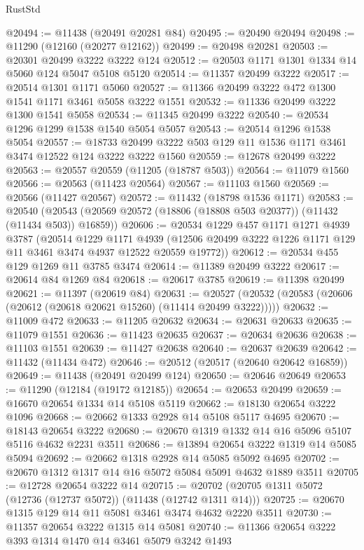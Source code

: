 \begin{lexlean}{RustStd}
\begin{coremodule}
@20494 := @11438 (@20491 @20281 @84)
@20495 := @20490 @20494
@20498 := @11290 (@12160 (@20277 @12162))
@20499 := @20498 @20281
@20503 := @20301 @20499 @3222 @3222 @124
@20512 := @20503 @1171 @1301 @1334 @14 @5060 @124 @5047 @5108 @5120
@20514 := @11357 @20499 @3222
@20517 := @20514 @1301 @1171 @5060
@20527 := @11366 @20499 @3222 @472 @1300 @1541 @1171 @3461 @5058 @3222 @1551
@20532 := @11336 @20499 @3222 @1300 @1541 @5058
@20534 := @11345 @20499 @3222
@20540 := @20534 @1296 @1299 @1538 @1540 @5054 @5057
@20543 := @20514 @1296 @1538 @5054
@20557 := @18733 @20499 @3222 @503 @129 @11 @1536 @1171 @3461 @3474 @12522 @124 @3222 @3222 @1560
@20559 := @12678 @20499 @3222
@20563 := @20557 @20559 (@11205 (@18787 @503))
@20564 := @11079 @1560
@20566 := @20563 (@11423 @20564)
@20567 := @11103 @1560
@20569 := @20566 (@11427 @20567)
@20572 := @11432 (@18798 @1536 @1171)
@20583 := @20540
    (@20543 (@20569 @20572 (@18806 (@18808 @503 @20377)) (@11432 (@11434 @503)) @16859))
@20606 := @20534
    @1229
    @457
    @1171
    @1271
    @4939
    @3787
    (@20514
      @1229
      @1171
      @4939
      (@12506 @20499 @3222 @1226 @1171 @129 @11 @3461 @3474 @4937 @12522 @20559 @19772))
@20612 := @20534 @455 @129 @1269 @11 @3785 @3474
@20614 := @11389 @20499 @3222
@20617 := @20614 @84 @1269 @84
@20618 := @20617 @3785
@20619 := @11398 @20499
@20621 := @11397 (@20619 @84)
@20631 := @20527 (@20532 (@20583 (@20606 (@20612 (@20618 @20621 @15260) (@11414 @20499 @3222)))))
@20632 := @11009 @472
@20633 := @11205 @20632
@20634 := @20631 @20633
@20635 := @11079 @1551
@20636 := @11423 @20635
@20637 := @20634 @20636
@20638 := @11103 @1551
@20639 := @11427 @20638
@20640 := @20637 @20639
@20642 := @11432 (@11434 @472)
@20646 := @20512 (@20517 (@20640 @20642 @16859))
@20649 := @11438 (@20491 @20499 @124)
@20650 := @20646 @20649
@20653 := @11290 (@12184 (@19172 @12185))
@20654 := @20653 @20499
@20659 := @16670 @20654 @1334 @14 @5108 @5119
@20662 := @18130 @20654 @3222 @1096
@20668 := @20662 @1333 @2928 @14 @5108 @5117 @4695
@20670 := @18143 @20654 @3222
@20680 := @20670 @1319 @1332 @14 @16 @5096 @5107 @5116 @4632 @2231 @3511
@20686 := @13894 @20654 @3222 @1319 @14 @5085 @5094
@20692 := @20662 @1318 @2928 @14 @5085 @5092 @4695
@20702 := @20670 @1312 @1317 @14 @16 @5072 @5084 @5091 @4632 @1889 @3511
@20705 := @12728 @20654 @3222 @14
@20715 := @20702 (@20705 @1311 @5072 (@12736 (@12737 @5072)) (@11438 (@12742 @1311 @14)))
@20725 := @20670 @1315 @129 @14 @11 @5081 @3461 @3474 @4632 @2220 @3511
@20730 := @11357 @20654 @3222 @1315 @14 @5081
@20740 := @11366 @20654 @3222 @393 @1314 @1470 @14 @3461 @5079 @3242 @1493

\end{coremodule}
\end{lexlean}
